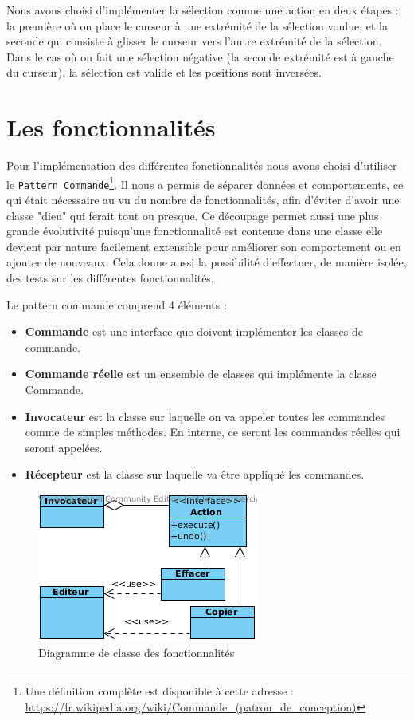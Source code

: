 \documentclass[french]{article}
\begin{document}
Nous avons choisi d'implémenter la sélection comme une action en deux étapes : la première où on place le curseur à une extrémité de la sélection voulue, et la seconde qui consiste à glisser le curseur vers l'autre extrémité de la sélection. Dans le cas où on fait une sélection \og{}négative\fg{} (la seconde extrémité est à gauche du curseur), la sélection est valide et les positions sont inversées.

\section{Les fonctionnalités}\label{sec:fonctionnalités}
Pour l'implémentation des différentes fonctionnalités nous avons choisi d'utiliser le \texttt{Pattern Commande}\footnote{Une définition complète est disponible à cette adresse : \url{https://fr.wikipedia.org/wiki/Commande_(patron_de_conception)}}. Il nous a permis de séparer données et comportements, ce qui était nécessaire au vu du nombre de fonctionnalités, afin d'éviter d'avoir une classe "dieu" qui ferait tout ou presque. Ce découpage permet aussi une plus grande évolutivité puisqu'une fonctionnalité est contenue dans une classe elle devient par nature facilement extensible pour améliorer son comportement ou en ajouter de nouveaux. Cela donne aussi la possibilité d'effectuer, de manière isolée, des tests sur les différentes fonctionnalités.

Le pattern commande comprend 4 éléments :
\begin{itemize}
	\item \textbf{Commande} est une interface que doivent implémenter les classes de commande.
	\item \textbf{Commande réelle} est un ensemble de classes qui implémente la classe Commande.
	\item \textbf{Invocateur} est la classe sur laquelle on va appeler toutes les commandes comme de simples méthodes. En interne, ce seront les commandes réelles qui seront appelées.
	\item \textbf{Récepteur} est la classe sur laquelle va être appliqué les commandes.
\end{itemize}

\begin{figure}[h!]
	\centering
	\includegraphics{command-pattern.png}
	\caption{Diagramme de classe des fonctionnalités}
\end{figure}
\end{document}
